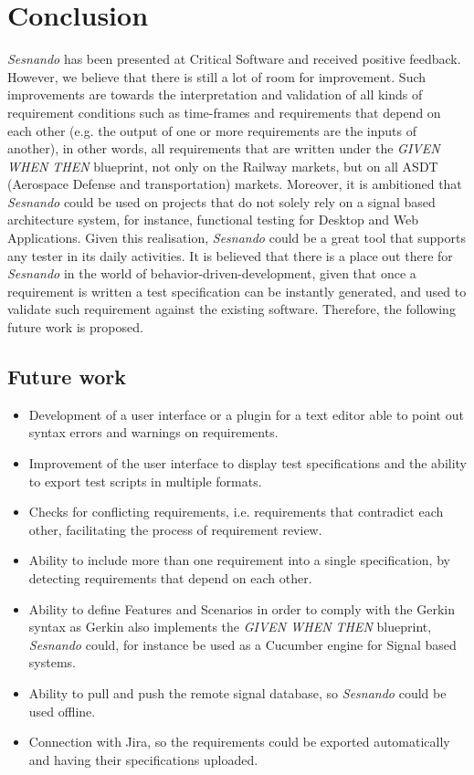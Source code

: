 \chapter*{Conclusion}
\label{ch:conclusion}

\textit{Sesnando} has been presented at Critical Software and received positive feedback. However, we believe that there is still a lot of room for improvement.
Such improvements are towards the interpretation and validation of all kinds of requirement conditions such as time-frames and requirements that depend on each other (e.g. the output of one or more requirements are the inputs of another), in other words, all requirements that are written under the \textit{GIVEN WHEN THEN} blueprint, not only on the Railway markets, but on all ASDT (Aerospace Defense and transportation) markets.
Moreover, it is ambitioned that \textit{Sesnando} could be used on projects that do not solely rely on a signal based architecture system, for instance, functional testing for Desktop and Web Applications. Given this realisation, \textit{Sesnando} could be a great tool that supports any tester in its daily activities. It is believed that there is a place out there for \textit{Sesnando} in the world of behavior-driven-development, given that once a requirement is written a test specification can be instantly generated, and used to validate such requirement against the existing software. Therefore, the following future work is proposed. 

\section*{Future work}
\label{sec:future_work}

\begin{itemize}
\item Development of a user interface or a plugin for a text editor able to point out syntax errors and warnings on requirements.
\item Improvement of the user interface to display test specifications and the ability to export test scripts in multiple formats.
\item Checks for conflicting requirements, i.e. requirements that contradict each other, facilitating the process of requirement review.
\item Ability to include more than one requirement into a single specification, by detecting requirements that depend on each other.
\item Ability to define Features and Scenarios in order to comply with the Gerkin syntax as Gerkin also implements the \textit{GIVEN WHEN THEN} blueprint, \textit{Sesnando} could, for instance be used as a Cucumber engine for Signal based systems. 
\item Ability to pull and push the remote signal database, so \textit{Sesnando} could be used offline.
\item Connection with Jira, so the requirements could be exported automatically and having their specifications uploaded. 
\end{itemize}